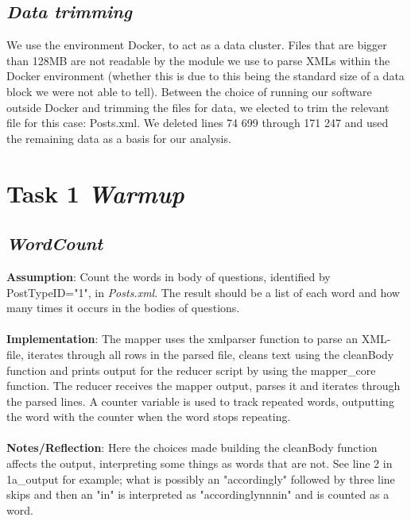 \documentclass[fleqn,10pt]{wlscirep}
\begin{document}
\subsection{\emph{Data trimming}}
We use the environment Docker, to act as a data cluster. Files that are bigger than 128MB are not readable by the module we use to parse XMLs within the Docker environment (whether this is due to this being the standard size of a data block we were not able to tell). Between the choice of running our software outside Docker and trimming the files for data, we elected to trim the relevant file for this case: Posts.xml. We deleted lines 74 699 through 171 247 and used the remaining data as a basis for our analysis.

\section{Task 1 \emph{Warmup}}
\subsection{\emph{WordCount}}
\textbf{Assumption}: Count the words in body of questions, identified by PostTypeID="1", in \textit{Posts.xml}. The result should be a list of each word and how many times it occurs in the bodies of questions. \\ \\
\textbf{Implementation}: The mapper uses the xmlparser function to parse an XML-file, iterates through all rows in the parsed file, cleans text using the cleanBody function and prints output for the reducer script by using the mapper\_core function.
The reducer receives the mapper output, parses it and iterates through the parsed lines. A counter variable is used to track repeated words, outputting the word with the counter when the word stops repeating. \\ \\
\textbf{Notes/Reflection}: Here the choices made building the cleanBody function affects the output, interpreting some things as words that are not. See line 2 in 1a\_output for example; what is possibly an "accordingly" followed by three line skips and then an "in" is interpreted as "accordinglynnnin" and is counted as a word. \\


\end{document}
